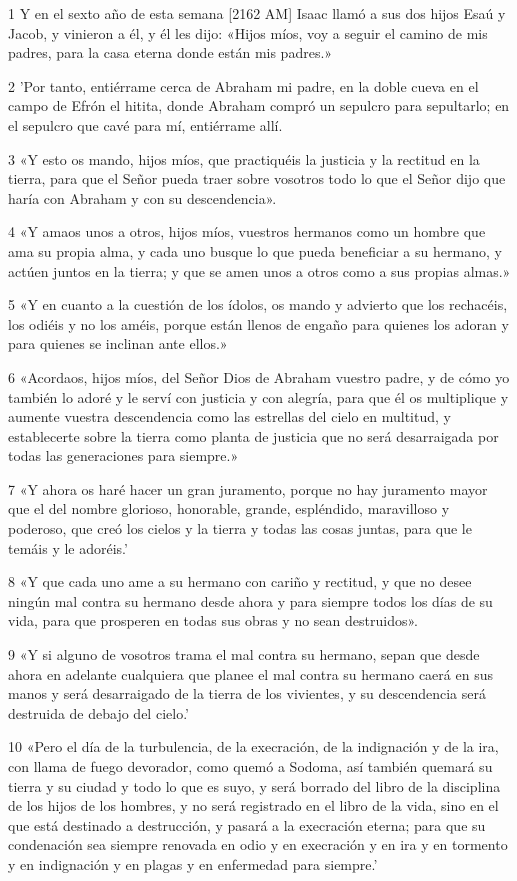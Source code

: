 \par 1 Y en el sexto año de esta semana [2162 AM] Isaac llamó a sus dos hijos Esaú y Jacob, y vinieron a él, y él les dijo: «Hijos míos, voy a seguir el camino de mis padres, para la casa eterna donde están mis padres.»
\par 2 'Por tanto, entiérrame cerca de Abraham mi padre, en la doble cueva en el campo de Efrón el hitita, donde Abraham compró un sepulcro para sepultarlo; en el sepulcro que cavé para mí, entiérrame allí.
\par 3 «Y esto os mando, hijos míos, que practiquéis la justicia y la rectitud en la tierra, para que el Señor pueda traer sobre vosotros todo lo que el Señor dijo que haría con Abraham y con su descendencia».
\par 4 «Y amaos unos a otros, hijos míos, vuestros hermanos como un hombre que ama su propia alma, y ​​cada uno busque lo que pueda beneficiar a su hermano, y actúen juntos en la tierra; y que se amen unos a otros como a sus propias almas.»
\par 5 «Y en cuanto a la cuestión de los ídolos, os mando y advierto que los rechacéis, los odiéis y no los améis, porque están llenos de engaño para quienes los adoran y para quienes se inclinan ante ellos.»
\par 6 «Acordaos, hijos míos, del Señor Dios de Abraham vuestro padre, y de cómo yo también lo adoré y le serví con justicia y con alegría, para que él os multiplique y aumente vuestra descendencia como las estrellas del cielo en multitud, y establecerte sobre la tierra como planta de justicia que no será desarraigada por todas las generaciones para siempre.»
\par 7 «Y ahora os haré hacer un gran juramento, porque no hay juramento mayor que el del nombre glorioso, honorable, grande, espléndido, maravilloso y poderoso, que creó los cielos y la tierra y todas las cosas juntas, para que le temáis y le adoréis.'
\par 8 «Y que cada uno ame a su hermano con cariño y rectitud, y que no desee ningún mal contra su hermano desde ahora y para siempre todos los días de su vida, para que prosperen en todas sus obras y no sean destruidos».
\par 9 «Y si alguno de vosotros trama el mal contra su hermano, sepan que desde ahora en adelante cualquiera que planee el mal contra su hermano caerá en sus manos y será desarraigado de la tierra de los vivientes, y su descendencia será destruida de debajo del cielo.'
\par 10 «Pero el día de la turbulencia, de la execración, de la indignación y de la ira, con llama de fuego devorador, como quemó a Sodoma, así también quemará su tierra y su ciudad y todo lo que es suyo, y será borrado del libro de la disciplina de los hijos de los hombres, y no será registrado en el libro de la vida, sino en el que está destinado a destrucción, y pasará a la execración eterna; para que su condenación sea siempre renovada en odio y en execración y en ira y en tormento y en indignación y en plagas y en enfermedad para siempre.'
